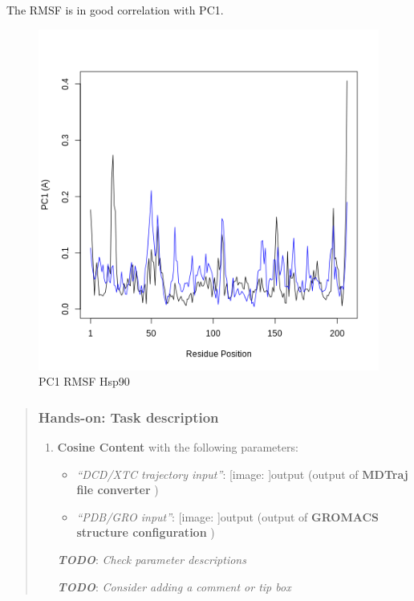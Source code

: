 \documentclass[twocolumn]{bmcart}%
\def\texttt{[image: ]}
\providecommand{\tightlist}{%
  \setlength{\itemsep}{0pt}\setlength{\parskip}{0pt}}
\begin{document}
The RMSF is in good correlation with PC1.

\begin{figure}
\centering
\includegraphics{images/htmd_analysis_pc1_rmsf.png}
\caption{PC1 RMSF Hsp90}
\end{figure}

\begin{quote}
\hypertarget{hands-on-task-description-14}{%
\subsubsection{Hands-on: Task
description}\label{hands-on-task-description-14}}

\begin{enumerate}
\def\labelenumi{\arabic{enumi}.}
\tightlist
\item
  \textbf{Cosine Content} with the following parameters:

  \begin{itemize}
  \tightlist
  \item
    \emph{``DCD/XTC trajectory input''}: \texttt{output} (output of
    \textbf{MDTraj file converter} )
  \item
    \emph{``PDB/GRO input''}: \texttt{output} (output of \textbf{GROMACS
    structure configuration} )
  \end{itemize}

  \textbf{\emph{TODO}}: \emph{Check parameter descriptions}

  \textbf{\emph{TODO}}: \emph{Consider adding a comment or tip box}
\end{enumerate}


\end{quote}
\end{document}
